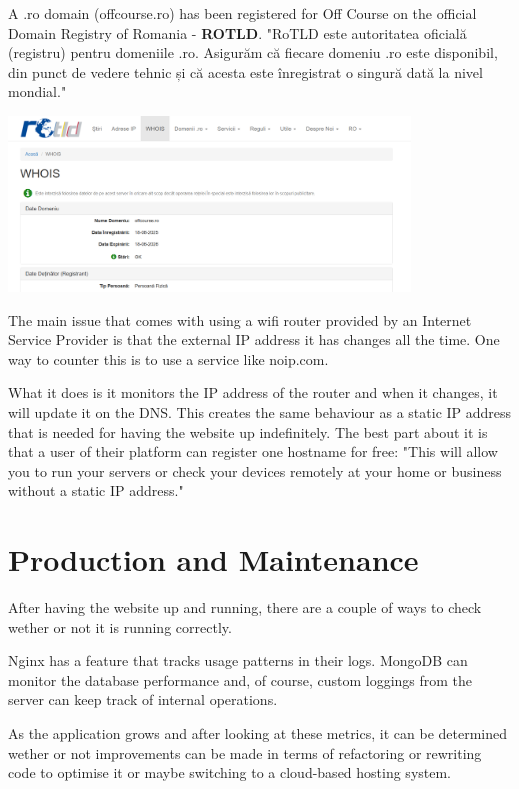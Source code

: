 \documentclass[12pt,a4paper]{report}
\begin{document}
A .ro domain (offcourse.ro) has been registered for Off Course on the official Domain Registry of Romania - \textbf{ROTLD}. "RoTLD este autoritatea oficială (registru) pentru domeniile .ro. Asigurăm că fiecare domeniu .ro este disponibil, din punct de vedere tehnic și că acesta este înregistrat o singură dată la nivel mondial."~\cite{roTLD}

\begin{center}
\includegraphics[width=0.8\textwidth]{images/dns.png}
\end{center}

The main issue that comes with using a wifi router provided by an Internet Service Provider is that the external IP address it has changes all the time. One way to counter this is to use a service like noip.com. 

What it does is it monitors the IP address of the router and when it changes, it will update it on the DNS. This creates the same behaviour as a static IP address that is needed for having the website up indefinitely. The best part about it is that a user of their platform can register one hostname for free: "This will allow you to run your servers or check your devices remotely at your home or business without a static IP address."~\cite{noipDNS}

\section{Production and Maintenance}

After having the website up and running, there are a couple of ways to check wether or not it is running correctly. 

Nginx has a feature that tracks usage patterns in their logs. MongoDB can monitor the database performance and, of course, custom loggings from the server can keep track of internal operations.

As the application grows and after looking at these metrics, it can be determined wether or not improvements can be made in terms of refactoring or rewriting code to optimise it or maybe switching to a cloud-based hosting system.
\end{document}
